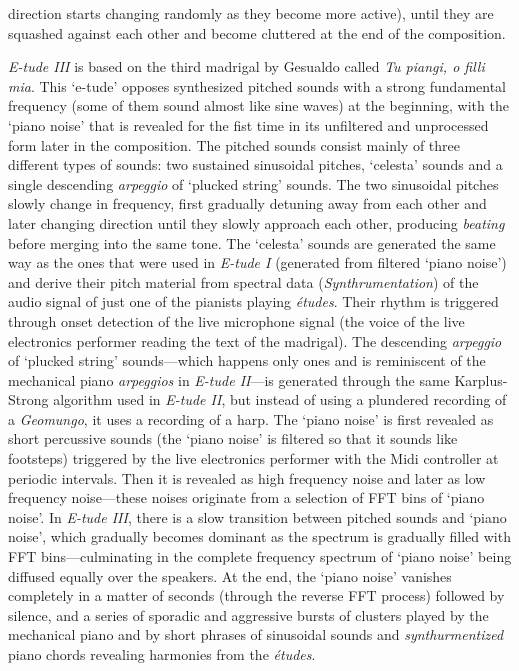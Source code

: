 direction starts changing randomly as they become more active), until they are squashed against each other and become cluttered at the end of the composition.

\emph{E-tude III} is based on the third madrigal by Gesualdo called \emph{Tu piangi, o filli mia}. This `e-tude' opposes synthesized pitched sounds with a strong fundamental frequency (some of them sound almost like sine waves) at the beginning, with the `piano noise' that is revealed for the fist time in its unfiltered and unprocessed form later in the composition. The pitched sounds consist mainly of three different types of sounds: two sustained sinusoidal pitches, `celesta' sounds and a single descending \emph{arpeggio} of `plucked string' sounds. The two sinusoidal pitches slowly change in frequency, first gradually detuning away from each other and later changing direction until they slowly approach each other, producing \emph{beating} before merging into the same tone. The `celesta' sounds are generated the same way as the ones that were used in \emph{E-tude I} (generated from filtered `piano noise') and derive their pitch material from spectral data (\emph{Synthrumentation}) of the audio signal of just one of the pianists playing \emph{\'{e}tudes}. Their rhythm is triggered through onset detection of the live microphone signal (the voice of the live electronics performer reading the text of the madrigal). The descending \emph{arpeggio} of `plucked string' sounds---which happens only ones and is reminiscent of the mechanical piano \emph{arpeggios} in \emph{E-tude II}---is generated through the same Karplus-Strong algorithm used in \emph{E-tude II}, but instead of using a plundered recording of a \emph{Geomungo}, it uses a recording of a harp. The `piano noise' is first revealed as short percussive sounds (the `piano noise' is filtered so that it sounds like footsteps) triggered by the live electronics performer with the Midi controller at periodic intervals. Then it is revealed as high frequency noise and later as low frequency noise---these noises originate from a selection of FFT bins of `piano noise'. In \emph{E-tude III}, there is a slow transition between pitched sounds and `piano noise', which gradually becomes dominant as the spectrum is gradually filled with FFT bins---culminating in the complete frequency spectrum of `piano noise' being diffused equally over the speakers. At the end, the `piano noise' vanishes completely in a matter of seconds (through the reverse FFT process) followed by silence, and a series of sporadic and aggressive bursts of clusters played by the mechanical piano and by short phrases of sinusoidal sounds and \emph{synthurmentized} piano chords revealing harmonies from the \emph{\'{e}tudes}. 

